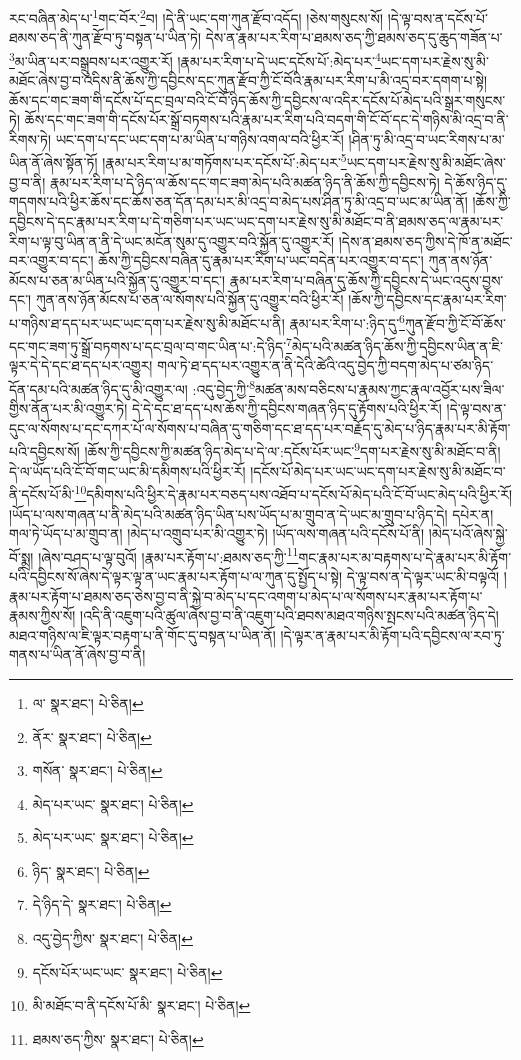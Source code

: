 རང་བཞིན་མེད་པ་\footnote{ལ་  སྣར་ཐང་།  པེ་ཅིན། }གང་བོར་\footnote{ནོར་  སྣར་ཐང་།  པེ་ཅིན། }བ། །དེ་ནི་ཡང་དག་ཀུན་རྫོབ་འདོད། །ཅེས་གསུངས་སོ། །དེ་ལྟ་བས་ན་དངོས་པོ་ཐམས་ཅད་ནི་ཀུན་རྫོབ་ཏུ་བསྟན་པ་ཡིན་ཏེ། དེས་ན་རྣམ་པར་རིག་པ་ཐམས་ཅད་ཀྱི་ཐམས་ཅད་དུ་ཆུད་གཟོན་པ་\footnote{གསོན་  སྣར་ཐང་།  པེ་ཅིན། }མ་ཡིན་པར་བསྒྲུབས་པར་འགྱུར་རོ། །རྣམ་པར་རིག་པ་དེ་ཡང་དངོས་པོ་:མེད་པར་\footnote{མེད་པར་ཡང་  སྣར་ཐང་།  པེ་ཅིན། }ཡང་དག་པར་རྗེས་སུ་མི་མཐོང་ཞེས་བྱ་བ་འདིས་ནི་ཆོས་ཀྱི་དབྱིངས་དང་ཀུན་རྫོབ་ཀྱི་ངོ་བོའི་རྣམ་པར་རིག་པ་མི་འདྲ་བར་དགག་པ་སྟེ། ཆོས་དང་གང་ཟག་གི་དངོས་པོ་དང་བྲལ་བའི་ངོ་བོ་ཉིད་ཆོས་ཀྱི་དབྱིངས་ལ་འདིར་དངོས་པོ་མེད་པའི་སྒྲར་གསུངས་ཏེ། ཆོས་དང་གང་ཟག་གི་དངོས་པོར་སྒྲོ་བཏགས་པའི་རྣམ་པར་རིག་པའི་བདག་གི་ངོ་བོ་དང་དེ་གཉིས་མི་འདྲ་བ་ནི་རིགས་ཏེ། ཡང་དག་པ་དང་ཡང་དག་པ་མ་ཡིན་པ་གཉིས་འགལ་བའི་ཕྱིར་རོ། །ཤིན་ཏུ་མི་འདྲ་བ་ཡང་རིགས་པ་མ་ཡིན་ནོ་ཞེས་སྟོན་ཏོ། །རྣམ་པར་རིག་པ་མ་གཏོགས་པར་དངོས་པོ་:མེད་པར་\footnote{མེད་པར་ཡང་  སྣར་ཐང་།  པེ་ཅིན། }ཡང་དག་པར་རྗེས་སུ་མི་མཐོང་ཞེས་བྱ་བ་ནི། རྣམ་པར་རིག་པ་དེ་ཉིད་ལ་ཆོས་དང་གང་ཟག་མེད་པའི་མཚན་ཉིད་ནི་ཆོས་ཀྱི་དབྱིངས་ཏེ། དེ་ཆོས་ཉིད་དུ་གདགས་པའི་ཕྱིར་ཆོས་དང་ཆོས་ཅན་དོན་དམ་པར་མི་འདྲ་བ་མེད་པས་ཤིན་ཏུ་མི་འདྲ་བ་ཡང་མ་ཡིན་ནོ། །ཆོས་ཀྱི་དབྱིངས་དེ་དང་རྣམ་པར་རིག་པ་དེ་གཅིག་པར་ཡང་ཡང་དག་པར་རྗེས་སུ་མི་མཐོང་བ་ནི་ཐམས་ཅད་ལ་རྣམ་པར་རིག་པ་ལྟ་བུ་ཡིན་ན་ནི་དེ་ཡང་མངོན་སུམ་དུ་འགྱུར་བའི་སྐྱོན་དུ་འགྱུར་རོ། །དེས་ན་ཐམས་ཅད་ཀྱིས་དེ་ཁོ་ན་མཐོང་བར་འགྱུར་བ་དང་། ཆོས་ཀྱི་དབྱིངས་བཞིན་དུ་རྣམ་པར་རིག་པ་ཡང་བདེན་པར་འགྱུར་བ་དང་། ཀུན་ནས་ཉོན་མོངས་པ་ཅན་མ་ཡིན་པའི་སྐྱོན་དུ་འགྱུར་བ་དང་། རྣམ་པར་རིག་པ་བཞིན་དུ་ཆོས་ཀྱི་དབྱིངས་དེ་ཡང་འདུས་བྱས་དང་། ཀུན་ནས་ཉོན་མོངས་པ་ཅན་ལ་སོགས་པའི་སྐྱོན་དུ་འགྱུར་བའི་ཕྱིར་རོ། །ཆོས་ཀྱི་དབྱིངས་དང་རྣམ་པར་རིག་པ་གཉིས་ཐ་དད་པར་ཡང་ཡང་དག་པར་རྗེས་སུ་མི་མཐོང་པ་ནི། རྣམ་པར་རིག་པ་:ཉིད་དུ་\footnote{ཉིད་  སྣར་ཐང་།  པེ་ཅིན། }ཀུན་རྫོབ་ཀྱི་ངོ་བོ་ཆོས་དང་གང་ཟག་ཏུ་སྒྲོ་བཏགས་པ་དང་བྲལ་བ་གང་ཡིན་པ་:དེ་ཉིད་\footnote{དེ་ཉིད་དེ་  སྣར་ཐང་།  པེ་ཅིན། }མེད་པའི་མཚན་ཉིད་ཆོས་ཀྱི་དབྱིངས་ཡིན་ན་ཇི་ལྟར་དེ་དེ་དང་ཐ་དད་པར་འགྱུར། གལ་ཏེ་ཐ་དད་པར་འགྱུར་ན་ནི་དེའི་ཚེའི་འདུ་བྱེད་ཀྱི་བདག་མེད་པ་ཙམ་ཉིད་དོན་དམ་པའི་མཚན་ཉིད་དུ་མི་འགྱུར་ལ། :འདུ་བྱེད་ཀྱི་\footnote{འདུ་བྱེད་ཀྱིས་  སྣར་ཐང་།  པེ་ཅིན། }མཚན་མས་བཅིངས་པ་རྣམས་ཀྱང་རྣལ་འབྱོར་པས་ཟིལ་གྱིས་ནོན་པར་མི་འགྱུར་ཏེ། དེ་དེ་དང་ཐ་དད་པས་ཆོས་ཀྱི་དབྱིངས་གཞན་ཉིད་དུ་རྟོགས་པའི་ཕྱིར་རོ། །དེ་ལྟ་བས་ན་དུང་ལ་སོགས་པ་དང་དཀར་པོ་ལ་སོགས་པ་བཞིན་དུ་གཅིག་དང་ཐ་དད་པར་བརྗོད་དུ་མེད་པ་ཉིད་རྣམ་པར་མི་རྟོག་པའི་དབྱིངས་སོ། །ཆོས་ཀྱི་དབྱིངས་ཀྱི་མཚན་ཉིད་མེད་པ་དེ་ལ་:དངོས་པོར་ཡང་\footnote{དངོས་པོར་ཡང་ཡང་  སྣར་ཐང་།  པེ་ཅིན། }དག་པར་རྗེས་སུ་མི་མཐོང་བ་ནི། དེ་ལ་ཡོད་པའི་ངོ་བོ་གང་ཡང་མི་དམིགས་པའི་ཕྱིར་རོ། །དངོས་པོ་མེད་པར་ཡང་ཡང་དག་པར་རྗེས་སུ་མི་མཐོང་བ་ནི་དངོས་པོ་མི་\footnote{མི་མཐོང་བ་ནི་དངོས་པོ་མི་  སྣར་ཐང་།  པེ་ཅིན། }དམིགས་པའི་ཕྱིར་དེ་རྣམ་པར་བཅད་པས་འཐོབ་པ་དངོས་པོ་མེད་པའི་ངོ་བོ་ཡང་མེད་པའི་ཕྱིར་རོ། །ཡོད་པ་ལས་གཞན་པ་ནི་མེད་པའི་མཚན་ཉིད་ཡིན་པས་ཡོད་པ་མ་གྲུབ་ན་དེ་ཡང་མ་གྲུབ་པ་ཉིད་དེ། དཔེར་ན། གལ་ཏེ་ཡོད་པ་མ་གྲུབ་ན། །མེད་པ་འགྲུབ་པར་མི་འགྱུར་ཏེ། །ཡོད་ལས་གཞན་པའི་དངོས་པོ་ནི། །མེད་པའོ་ཞེས་སྐྱེ་བོ་སྨྲ། །ཞེས་བཤད་པ་ལྟ་བུའོ། །རྣམ་པར་རྟོག་པ་:ཐམས་ཅད་ཀྱི་\footnote{ཐམས་ཅད་ཀྱིས་  སྣར་ཐང་།  པེ་ཅིན། }གང་རྣམ་པར་མ་བརྟགས་པ་དེ་རྣམ་པར་མི་རྟོག་པའི་དབྱིངས་སོ་ཞེས་དེ་ལྟར་ལྟ་ན་ཡང་རྣམ་པར་རྟོག་པ་ལ་ཀུན་དུ་སྤྱོད་པ་སྟེ། དེ་ལྟ་བས་ན་དེ་ལྟར་ཡང་མི་བལྟའོ། །རྣམ་པར་རྟོག་པ་ཐམས་ཅད་ཅེས་བྱ་བ་ནི་སྐྱེ་བ་མེད་པ་དང་འགག་པ་མེད་པ་ལ་སོགས་པར་རྣམ་པར་རྟོག་པ་རྣམས་ཀྱིས་སོ། །འདི་ནི་འཇུག་པའི་ཚུལ་ཞེས་བྱ་བ་ནི་འཇུག་པའི་ཐབས་མཐའ་གཉིས་སྤངས་པའི་མཚན་ཉིད་དེ། མཐའ་གཉིས་ལ་ཇི་ལྟར་བརྟག་པ་ནི་གོང་དུ་བསྟན་པ་ཡིན་ནོ། །དེ་ལྟར་ན་རྣམ་པར་མི་རྟོག་པའི་དབྱིངས་ལ་རབ་ཏུ་གནས་པ་ཡིན་ནོ་ཞེས་བྱ་བ་ནི། 
